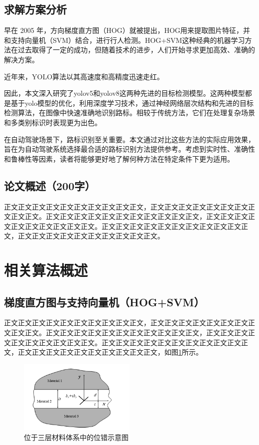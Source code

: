 \documentclass{article}
\begin{document}
\subsection{求解方案分析}
早在 2005 年，方向梯度直方图（HOG）就被提出，HOG用来提取图片特征，并和支持向量机（SVM）结合，进行行人检测。HOG+SVM这种经典的机器学习方法在过去取得了一定的成功，但随着技术的进步，人们开始寻求更加高效、准确的解决方案。

近年来，YOLO算法以其高速度和高精度迅速走红。

因此，本文深入研究了yolov5和yolov8这两种先进的目标检测模型。这两种模型都是基于yolo模型的优化，利用深度学习技术，通过神经网络层次结构和先进的目标检测算法，在图像中快速准确地识别路标。相较于传统方法，它们在处理复杂场景和多类别标识时表现更为出色。

在自动驾驶场景下，路标识别至关重要。本文通过对比这些方法的实际应用效果，旨在为自动驾驶系统选择最合适的路标识别方法提供参考。考虑到实时性、准确性和鲁棒性等因素，读者将能够更好地了解何种方法在特定条件下更为适用。

\subsection{论文概述（200字）}
正文正文正文正文正文正文正文正文正文正文，正文正文正文正文正文正文正文正文正文正文。正文正文正文正文正文正文正文正文正文正文正文，正文正文正文正文正文正文正文正文正文正文。正文正文正文正文正文正文正文正文正文正文正文，正文正文正文正文正文正文正文正文正文正文。

\section{相关算法概述}
\subsection{梯度直方图与支持向量机（HOG+SVM）}
正文正文正文正文正文正文正文正文正文正文，正文正文正文正文正文正文正文正文正文正文。正文正文正文正文正文正文正文正文正文正文正文，正文正文正文正文正文正文正文正文正文正文。正文正文正文正文正文正文正文正文正文正文正文，正文正文正文正文正文正文正文正文正文正文，如图\ref{fig:sample}所示。
\begin{figure}[H]
    \centering
    \includegraphics[width=0.5\textwidth]{sample.png}
    \caption{位于三层材料体系中的位错示意图}
    \label{fig:sample}
\end{figure}
\end{document}
